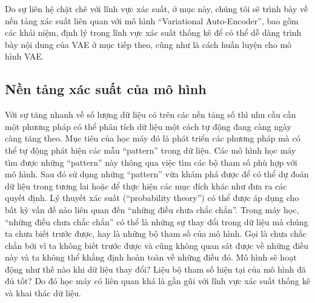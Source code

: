         Do sự liên hệ chặt chẽ với lĩnh vực xác suất, ở mục này, chúng tôi sẽ trình bày về nền tảng xác suất liên quan với mô hình ``Variational Auto-Encoder'', bao gồm các khái niệm, định lý trong lĩnh vực xác suất thống kê để có thể dễ dàng trình bày nội dung của VAE ở mục tiếp theo, cũng như là cách huấn luyện cho mô hình VAE. 
        

    \subsection{Nền tảng xác suất của mô hình} \label{chap2/subsec21}
        
        Với sự tăng nhanh về số lượng dữ liệu có trên các nền tảng số thì nhu cầu cần một phương pháp có thể phân tích dữ liệu một cách tự động đang  càng ngày càng tăng theo.
        Mục tiêu của học máy đó là phát triển các phương pháp mà có thể tự động phát hiện các mẫu ``pattern'' trong dữ liệu.
        Các mô hình học máy tìm được những ``pattern'' này thông qua việc tìm các bộ tham số phù hợp với mô hình.
        Sau đó sử dụng những ``pattern'' vừa khám phá được để có thể dự đoán dữ liệu trong tương lai hoặc để thực hiện các mục đích khác như đưa ra các quyết định.
        Lý thuyết xác suất (``probability theory'') có thể được áp dụng cho bất kỳ vấn đề nào liên quan đến ``những điều chưa chắc chắn''. 
        Trong máy học, ``những điều chưa chắc chắn'' có thể là những sự thay đổi trong dữ liệu mà chúng ta chưa biết trước được, hay là những bộ tham số của mô hình.
        Gọi là chưa chắc chắn bởi vì ta không biết trước được và cũng không quan sát được về những điều này và ta không thể khẳng định hoàn toàn về những điều đó.
        Mô hình sẽ hoạt động như thế nào khi dữ liệu thay đổi? Liệu bộ tham số hiện tại của mô hình đã đủ tốt?
        Do đó học máy có liên quan khá là gần gũi với lĩnh vực xác suất thống kê và khai thác dữ liệu.

